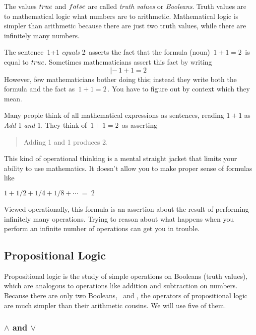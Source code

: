 \documentclass[fleqn,leqno]{article}
\begin{document}
The values $\TRUE$ and $\FALSE$ are called 
\emph{truth values} or
\emph{Booleans}.  Truth values are to mathematical logic what numbers
are to arithmetic.  Mathematical logic is simpler than arithmetic
because there are just two truth values, while there are infinitely
many numbers.

\medskip

The sentence \,1+1 \emph{equals} 2\, asserts the fact that the formula
(noun) $\,1+1=2\,$ is equal to $\TRUE$.  Sometimes mathematicians
assert this fact by writing 
 \[|-\,1+1=2\, \]
However, few mathematicians bother doing this; instead they write both
the formula and the fact as $\,1+1=2\,$.  You have to figure out by
context which they mean.

Many people think of all mathematical expressions as sentences, reading
$1+1$ as \emph{Add} 1 \emph{and} 1.  They think of $\,1+1=2\,$ as asserting
\begin{quote}
Adding 1 and 1 produces 2.
\end{quote}
This kind of operational thinking is a mental straight jacket that
limits your ability to use mathematics.  It doesn't allow you to make
proper sense of formulas like
\begin{display}
 $ 1 + 1/2 + 1/4 + 1/8 + \cdots \;=\; 2$%
\end{display}
Viewed operationally, this formula is an assertion about the result of
performing infinitely many operations.  Trying to reason about what
happens when you perform an infinite number of operations can get you
in trouble.  



\subsection[Propositional Logic]{Propositional Logic%
  } 


Propositional logic is the study of simple operations on Booleans
(truth values), which are analogous to operations like addition and
subtraction on numbers.  Because there are only two Booleans, \TRUE\
and \FALSE, the operators of propositional logic are much simpler than
their arithmetic cousins.  We will use five of them.

\subsubsection{\protect\ensuremath{\land} and \protect\ensuremath{\lor}}%
\label{sec:andor}
\end{document}
